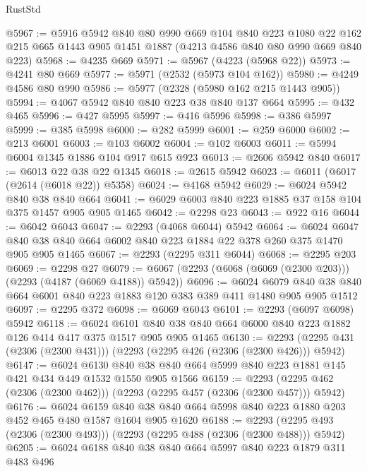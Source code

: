 \begin{lexlean}{RustStd}
\begin{coremodule}
@5967 := @5916
    @5942
    @840
    @80
    @990
    @669
    @104
    @840
    @223
    @1080
    @22
    @162
    @215
    @665
    @1443
    @905
    @1451
    @1887
    (@4213 @4586 @840 @80 @990 @669 @840 @223)
@5968 := @4235 @669
@5971 := @5967 (@4223 (@5968 @22))
@5973 := @4241 @80 @669
@5977 := @5971 (@2532 (@5973 @104 @162))
@5980 := @4249 @4586 @80 @990
@5986 := @5977 (@2328 (@5980 @162 @215 @1443 @905))
@5994 := @4067 @5942 @840 @840 @223 @38 @840 @137 @664
@5995 := @432 @465
@5996 := @427 @5995
@5997 := @416 @5996
@5998 := @386 @5997
@5999 := @385 @5998
@6000 := @282 @5999
@6001 := @259 @6000
@6002 := @213 @6001
@6003 := @103 @6002
@6004 := @102 @6003
@6011 := @5994 @6004 @1345 @1886 @104 @917 @615 @923
@6013 := @2606 @5942 @840
@6017 := @6013 @22 @38 @22 @1345
@6018 := @2615 @5942
@6023 := @6011 (@6017 (@2614 (@6018 @22)) @5358)
@6024 := @4168 @5942
@6029 := @6024 @5942 @840 @38 @840 @664
@6041 := @6029 @6003 @840 @223 @1885 @37 @158 @104 @375 @1457 @905 @905 @1465
@6042 := @2298 @23
@6043 := @922 @16
@6044 := @6042 @6043
@6047 := @2293 (@4068 @6044) @5942
@6064 := @6024
    @6047
    @840
    @38
    @840
    @664
    @6002
    @840
    @223
    @1884
    @22
    @378
    @260
    @375
    @1470
    @905
    @905
    @1465
@6067 := @2293 (@2295 @311 @6044)
@6068 := @2295 @203
@6069 := @2298 @27
@6079 := @6067 (@2293 (@6068 (@6069 (@2300 @203))) (@2293 (@4187 (@6069 @4188)) @5942))
@6096 := @6024
    @6079
    @840
    @38
    @840
    @664
    @6001
    @840
    @223
    @1883
    @120
    @383
    @389
    @411
    @1480
    @905
    @905
    @1512
@6097 := @2295 @372
@6098 := @6069 @6043
@6101 := @2293 (@6097 @6098) @5942
@6118 := @6024
    @6101
    @840
    @38
    @840
    @664
    @6000
    @840
    @223
    @1882
    @126
    @414
    @417
    @375
    @1517
    @905
    @905
    @1465
@6130 := @2293 (@2295 @431 (@2306 (@2300 @431))) (@2293 (@2295 @426 (@2306 (@2300 @426))) @5942)
@6147 := @6024
    @6130
    @840
    @38
    @840
    @664
    @5999
    @840
    @223
    @1881
    @145
    @421
    @434
    @449
    @1532
    @1550
    @905
    @1566
@6159 := @2293 (@2295 @462 (@2306 (@2300 @462))) (@2293 (@2295 @457 (@2306 (@2300 @457))) @5942)
@6176 := @6024
    @6159
    @840
    @38
    @840
    @664
    @5998
    @840
    @223
    @1880
    @203
    @452
    @465
    @480
    @1587
    @1604
    @905
    @1620
@6188 := @2293 (@2295 @493 (@2306 (@2300 @493))) (@2293 (@2295 @488 (@2306 (@2300 @488))) @5942)
@6205 := @6024
    @6188
    @840
    @38
    @840
    @664
    @5997
    @840
    @223
    @1879
    @311
    @483
    @496

\end{coremodule}
\end{lexlean}
